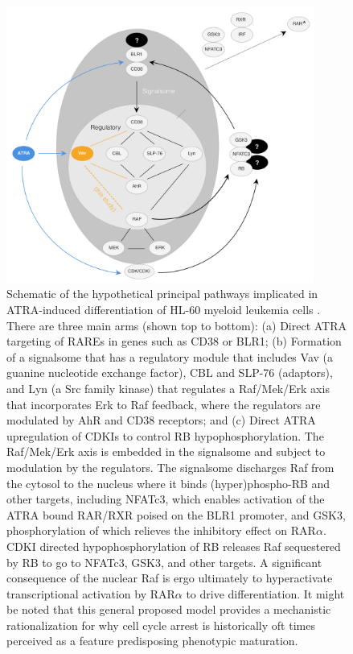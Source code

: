 \documentclass[12pt]{article}
\begin{document}
\begin{figure}[!t]
\includegraphics[width=0.9\textwidth]{./figs/Fig-9-ATRA-Schematic.pdf}
\caption{Schematic of the hypothetical principal pathways implicated in ATRA-induced differentiation of HL-60 myeloid leukemia cells
\cite{wallace2016rrd,congleton2012src,congleton2014phosphorylation,Shen:2009aa,Bunaciu:2015aa,shen2008c}.
There are three main arms (shown top to bottom):
(a) Direct ATRA targeting of RAREs in genes such as CD38 or BLR1;
(b) Formation of a signalsome that has a regulatory module that includes Vav (a guanine nucleotide exchange factor),
CBL and SLP-76 (adaptors), and Lyn (a Src family kinase) that
regulates a Raf/Mek/Erk axis that incorporates Erk to Raf feedback, where the regulators are modulated by AhR and CD38 receptors; and
(c) Direct ATRA upregulation of CDKIs to control RB hypophosphorylation.
The Raf/Mek/Erk axis is embedded in the signalsome and
subject to modulation by the regulators. The signalsome discharges Raf
from the cytosol to the nucleus where it binds (hyper)phospho-RB and other targets, including
NFATc3, which enables activation of the ATRA bound RAR/RXR poised on the BLR1 promoter,
and GSK3, phosphorylation of which relieves the inhibitory effect on RAR$\alpha$.
CDKI directed hypophosphorylation of RB releases Raf sequestered by RB to go to NFATc3, GSK3, and other targets.
A significant consequence of the nuclear Raf is ergo ultimately to hyperactivate
transcriptional activation by RAR$\alpha$ to drive differentiation.
It might be noted that this general proposed model provides a mechanistic rationalization for
why cell cycle arrest is historically oft times perceived as a feature predisposing phenotypic
maturation.}\label{fig:signalsome-schematic}
\end{figure}


\clearpage

\renewcommand\thefigure{S\arabic{figure}}
\renewcommand\thetable{T\arabic{table}}
\renewcommand\thepage{S-\arabic{page}}
\renewcommand\theequation{S\arabic{equation}}

\setcounter{equation}{0}
\setcounter{table}{0}
\setcounter{figure}{0}
\setcounter{page}{1}
\end{document}
